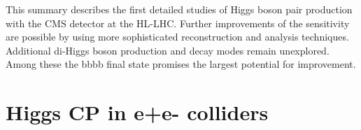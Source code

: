 This summary describes the first detailed studies of Higgs boson pair production with the CMS \phasetwo detector at the HL-LHC. Further improvements of the sensitivity are possible by using more sophisticated reconstruction and analysis techniques. Additional di-Higgs boson production and decay modes remain unexplored. Among these the bbbb final state promises the largest potential for improvement.

\section{Higgs CP in e+e- colliders}
